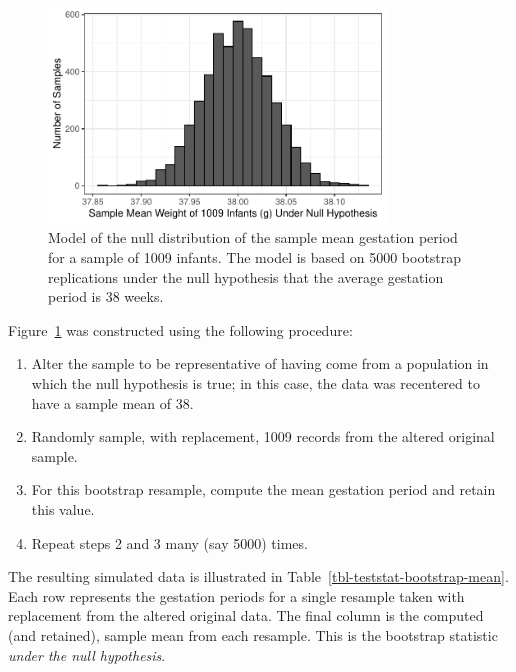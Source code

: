 \documentclass[
  letterpaper,
  DIV=11,
  numbers=noendperiod]{scrreprt}
\providecommand{\tightlist}{%
  \setlength{\itemsep}{0pt}\setlength{\parskip}{0pt}}\usepackage{longtable,booktabs,array}
\theoremstyle{definition}
\theoremstyle{definition}
\theoremstyle{plain}
\theoremstyle{remark}
\begin{document}
\begin{figure}

{\centering \includegraphics[width=0.8\textwidth,height=\textheight]{./images/fig-teststat-null-mean-1.pdf}

}

\caption{\label{fig-teststat-null-mean}Model of the null distribution of
the sample mean gestation period for a sample of 1009 infants. The model
is based on 5000 bootstrap replications under the null hypothesis that
the average gestation period is 38 weeks.}

\end{figure}

Figure~\ref{fig-teststat-null-mean} was constructed using the following
procedure:

\begin{enumerate}
\def\labelenumi{\arabic{enumi}.}
\tightlist
\item
  Alter the sample to be representative of having come from a population
  in which the null hypothesis is true; in this case, the data was
  recentered to have a sample mean of 38.
\item
  Randomly sample, with replacement, 1009 records from the altered
  original sample.
\item
  For this bootstrap resample, compute the mean gestation period and
  retain this value.
\item
  Repeat steps 2 and 3 many (say 5000) times.
\end{enumerate}

The resulting simulated data is illustrated in
Table~\ref{tbl-teststat-bootstrap-mean}. Each row represents the
gestation periods for a single resample taken with replacement from the
altered original data. The final column is the computed (and retained),
sample mean from each resample. This is the bootstrap statistic
\emph{under the null hypothesis}.
\end{document}
